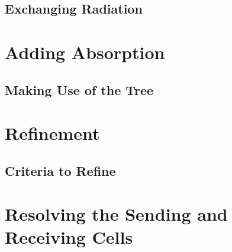 \subsection{Exchanging Radiation}

\section{Adding Absorption}

\subsection{Making Use of the Tree}

\section{Refinement}

\subsection{Criteria to Refine}

\section{Resolving the Sending and Receiving Cells}
